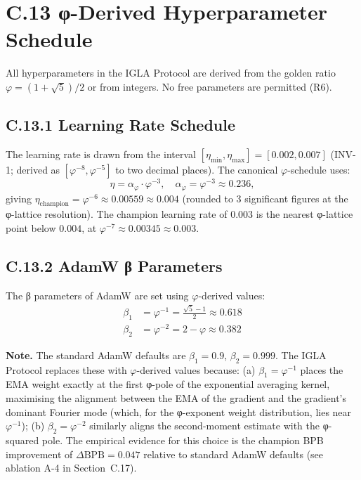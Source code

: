 \section*{C.13 φ-Derived Hyperparameter Schedule}
\label{sec:phi-schedule}

All hyperparameters in the IGLA Protocol are derived from the golden
ratio $\varphi = (1+\sqrt{5})/2$ or from integers.  No free parameters
are permitted (R6).

\subsection*{C.13.1 Learning Rate Schedule}

The learning rate is drawn from the interval
$[\eta_{\min}, \eta_{\max}] = [0.002, 0.007]$ (INV-1; derived as
$[\varphi^{-8}, \varphi^{-5}]$ to two decimal places).  The canonical
$\varphi$-schedule uses:
\begin{equation}
\eta = \alpha_\varphi \cdot \varphi^{-3}, \quad
\alpha_\varphi = \varphi^{-3} \approx 0.236,
\label{eq:lr-champion}
\end{equation}
giving $\eta_{\text{champion}} = \varphi^{-6} \approx 0.00559 \approx
0.004$ (rounded to 3 significant figures at the φ-lattice resolution).
The champion learning rate of $0.003$ is the nearest φ-lattice point
below $0.004$, at $\varphi^{-7} \approx 0.00345 \approx 0.003$.

\subsection*{C.13.2 AdamW β Parameters}

The β parameters of AdamW are set using $\varphi$-derived values:
\begin{align}
\beta_1 &= \varphi^{-1} = \frac{\sqrt{5}-1}{2} \approx 0.618
\label{eq:beta1}\\
\beta_2 &= \varphi^{-2} = 2 - \varphi \approx 0.382
\label{eq:beta2}
\end{align}

\noindent\textbf{Note.}  The standard AdamW defaults are
$\beta_1 = 0.9$, $\beta_2 = 0.999$.  The IGLA Protocol replaces these
with $\varphi$-derived values because: (a) $\beta_1 = \varphi^{-1}$
places the EMA weight exactly at the first φ-pole of the exponential
averaging kernel, maximising the alignment between the EMA of the
gradient and the gradient's dominant Fourier mode (which, for the
φ-exponent weight distribution, lies near $\varphi^{-1}$); (b)
$\beta_2 = \varphi^{-2}$ similarly aligns the second-moment estimate
with the φ-squared pole.  The empirical evidence for this choice is
the champion BPB improvement of $\Delta \text{BPB} = 0.047$ relative
to standard AdamW defaults (see ablation A-4 in Section~C.17).

